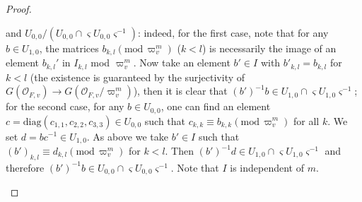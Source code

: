 \documentclass[10pt,a4paper]{amsart}
\begin{document}
\begin{proof}
\begin{enumerate}
			and
			$U_{0,0}/(U_{0,0}\cap
			\varsigma U_{0,0}\varsigma^{-1})$:
			indeed, for the first case,
			note that
			for any
			$b\in
			U_{1,0}$,
			the matrices
			$b_{k,l}
			(\mathrm{mod}\,\varpi_v^m)$
			($k<l$)
			is necessarily the image of an element
			$b_{k,l}'$ in
			$I_{k,l}$
			mod $\varpi_v^m$.
			Now take an element
			$b'\in I$
			with
			$b'_{k,l}=b_{k,l}$
			for $k<l$
			(the existence is guaranteed by the surjectivity of
			$G(\mathcal{O}_{F,v})
			\rightarrow
			G(\mathcal{O}_{F,v}/\varpi_v^m)$),
			then it is clear that
			$(b')^{-1}b\in
			U_{1,0}\cap
			\varsigma U_{1,0}\varsigma^{-1}$;
			for the second case,
			for any $b\in U_{0,0}$,
			one can find an element
			$c=\mathrm{diag}(c_{1,1},c_{2,2},c_{3,3})
			\in
			U_{0,0}$
			such that
			$c_{k,k}
			\equiv
			b_{k,k}
			(\mathrm{mod}\,\varpi_v^m)$
			for all $k$.
			We set
			$d=bc^{-1}
			\in
			U_{1,0}$.
			As above we take
			$b'\in I$
			such that
			$(b')_{k,l}\equiv
			d_{k,l}
			(\mathrm{mod}\,\varpi_v^m)$
			for $k<l$.
			Then
			$(b')^{-1}d\in
			U_{1,0}
			\cap
			\varsigma
			U_{1,0}\varsigma^{-1}$
			and therefore
			$(b')^{-1}b\in
			U_{0,0}\cap
			\varsigma U_{0,0}\varsigma^{-1}$.
			Note that
			$I$ is independent of $m$.
			
			
			

\end{enumerate}
\end{proof}
\end{document}
